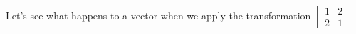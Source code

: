 \documentclass[preview]{standalone}
\begin{document}
\begin{minipage}
{8cm}Let's see what happens to a vector when we apply the transformation $\begin{bmatrix}1 & 2\\ 2 & 1\end{bmatrix}$
\end{minipage}
\end{document}
